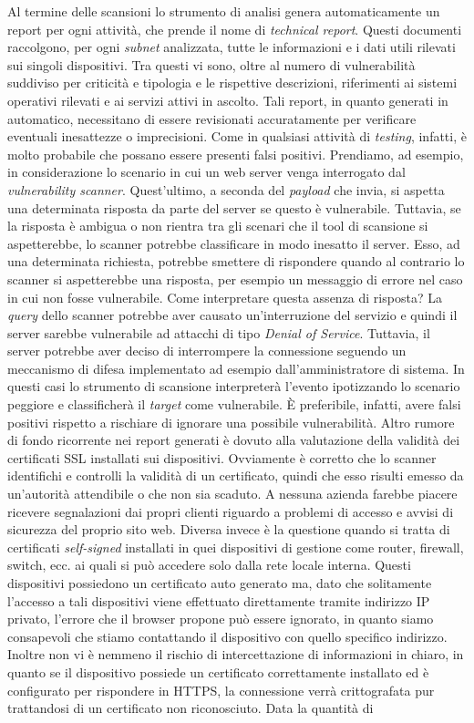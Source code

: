 \documentclass[target=bach,aauheader=]{thud}
\begin{document}
Al termine delle scansioni lo strumento di analisi genera automaticamente un report per ogni attività, che prende il nome di \textit{technical report}. Questi documenti raccolgono, per ogni \textit{subnet} analizzata, tutte le informazioni e i dati utili rilevati sui singoli dispositivi. Tra questi vi sono, oltre al numero di vulnerabilità suddiviso per criticità e tipologia e le rispettive descrizioni, riferimenti ai sistemi operativi rilevati e ai servizi attivi in ascolto. Tali report, in quanto generati in automatico, necessitano di essere revisionati accuratamente per verificare eventuali inesattezze o imprecisioni. Come in qualsiasi attività di \textit{testing}, infatti, è molto probabile che possano essere presenti falsi positivi. Prendiamo, ad esempio, in considerazione lo scenario in cui un web server venga interrogato dal \textit{vulnerability scanner}. Quest’ultimo, a seconda del \textit{payload} che invia, si aspetta una determinata risposta da parte del server se questo è vulnerabile. Tuttavia, se la risposta è ambigua o non rientra tra gli scenari che il tool di scansione si aspetterebbe, lo scanner potrebbe classificare in modo inesatto il server. Esso, ad una determinata richiesta, potrebbe smettere di rispondere quando al contrario lo scanner si aspetterebbe una risposta, per esempio un messaggio di errore nel caso in cui non fosse vulnerabile. Come interpretare questa assenza di risposta? La \textit{query} dello scanner potrebbe aver causato un’interruzione del servizio e quindi il server sarebbe vulnerabile ad attacchi di tipo \textit{Denial of Service}. Tuttavia, il server potrebbe aver deciso di interrompere la connessione seguendo un meccanismo di difesa implementato ad esempio dall’amministratore di sistema. In questi casi lo strumento di scansione interpreterà l’evento ipotizzando lo scenario peggiore e classificherà il \textit{target} come vulnerabile. È preferibile, infatti, avere falsi positivi rispetto a rischiare di ignorare una possibile vulnerabilità. Altro rumore di fondo ricorrente nei report generati è dovuto alla valutazione della validità dei certificati SSL installati sui dispositivi. Ovviamente è corretto che lo scanner identifichi e controlli la validità di un certificato, quindi che esso risulti emesso da un’autorità attendibile o che non sia scaduto. A nessuna azienda farebbe piacere ricevere segnalazioni dai propri clienti riguardo a problemi di accesso e avvisi di sicurezza del proprio sito web. Diversa invece è la questione quando si tratta di certificati \textit{self-signed} installati in quei dispositivi di gestione come router, firewall, switch, ecc. ai quali si può accedere solo dalla rete locale interna. Questi dispositivi possiedono un certificato auto generato ma, dato che solitamente l’accesso a tali dispositivi viene effettuato direttamente tramite indirizzo IP privato, l’errore che il browser propone può essere ignorato, in quanto siamo consapevoli che stiamo contattando il dispositivo con quello specifico indirizzo. Inoltre non vi è nemmeno il rischio di intercettazione di informazioni in chiaro, in quanto se il dispositivo possiede un certificato correttamente installato ed è configurato per rispondere in HTTPS, la connessione verrà crittografata pur trattandosi di un certificato non riconosciuto. Data la quantità di 
\end{document}
